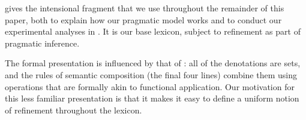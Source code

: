 \documentclass[leqno]{article}
\begin{document}

 gives the intensional fragment that we use
throughout the remainder of this paper, both to explain how our
pragmatic model works and to conduct our experimental analyses in
. It is our base lexicon, subject to refinement as
part of pragmatic inference.

The formal presentation is influenced by that of \citet{Muskens95}:
all of the denotations are sets, and the rules of semantic composition
(the final four lines) combine them using operations that are formally
akin to functional application. Our motivation for this less familiar
presentation is that it makes it easy to define a uniform notion of
refinement throughout the lexicon.
\end{document}
